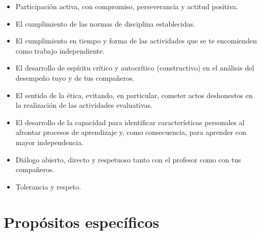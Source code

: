 \documentclass[11pt]{article}
\begin{document}
\begin{itemize}
	\renewcommand\labelitemi{\faCheckCircle}
	\item Participación activa, con compromiso, perseverancia y actitud positiva. 
	\item El cumplimiento de las normas de disciplina establecidas.
	\item El cumplimiento en tiempo y forma de las actividades que se te encomienden como trabajo independiente. 
	\item El desarrollo de espíritu crítico y autocrítico (constructivo) en el análisis del desempeño tuyo y de tus compañeros. 
	\item El sentido de la ética, evitando, en particular, cometer actos deshonestos en la realización de las actividades evaluativas.
	\item El desarrollo de la capacidad para identificar características personales al afrontar procesos de aprendizaje y, como consecuencia, para aprender con mayor independencia.
	\item Diálogo abierto, directo y respetuoso tanto con el profesor como con tus compañeros. 
	\item Tolerancia y respeto. 
\end{itemize}

\section{Propósitos específicos}
\end{document}
